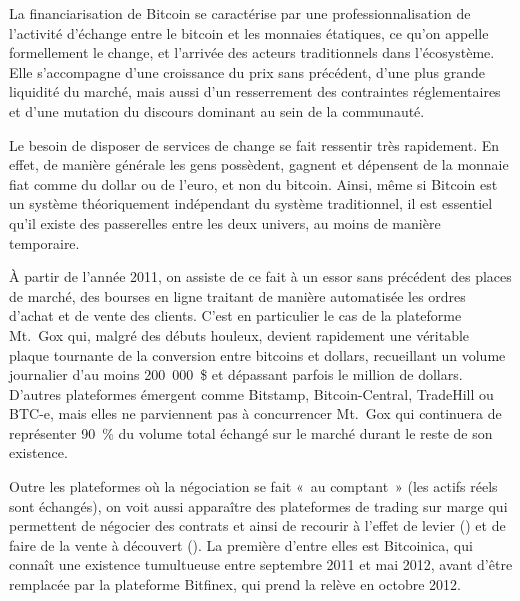 La financiarisation de Bitcoin se caractérise par une professionnalisation de l'activité d'échange entre le bitcoin et les monnaies étatiques, ce qu'on appelle formellement le change, et l'arrivée des acteurs traditionnels dans l'écosystème. Elle s'accompagne d'une croissance du prix sans précédent, d'une plus grande liquidité du marché, mais aussi d'un resserrement des contraintes réglementaires et d'une mutation du discours dominant au sein de la communauté.


Le besoin de disposer de services de change se fait ressentir très rapidement. En effet, de manière générale les gens possèdent, gagnent et dépensent de la monnaie fiat comme du dollar ou de l'euro, et non du bitcoin. Ainsi, même si Bitcoin est un système théoriquement indépendant du système traditionnel, il est essentiel qu'il existe des passerelles entre les deux univers, au moins de manière temporaire.

À partir de l'année 2011, on assiste de ce fait à un essor sans précédent des places de marché, des bourses en ligne traitant de manière automatisée les ordres d'achat et de vente des clients. C'est en particulier le cas de la plateforme Mt.~Gox qui, malgré des débuts houleux, devient rapidement une véritable plaque tournante de la conversion entre bitcoins et dollars, recueillant un volume journalier d'au moins 200~000~\$ et dépassant parfois le million de dollars. D'autres plateformes émergent comme Bitstamp, Bitcoin-Central, TradeHill ou BTC-e, mais elles ne parviennent pas à concurrencer Mt.~Gox qui continuera de représenter 90~\% du volume total échangé sur le marché durant le reste de son existence. %

Outre les plateformes où la négociation se fait «~au comptant~» (les actifs réels sont échangés), on voit aussi apparaître des plateformes de trading sur marge qui permettent de négocier des contrats et ainsi de recourir à l'effet de levier () et de faire de la vente à découvert (). La première d'entre elles est Bitcoinica, qui connaît une existence tumultueuse entre septembre 2011 et mai 2012, avant d'être remplacée par la plateforme Bitfinex, qui prend la relève en octobre 2012.

